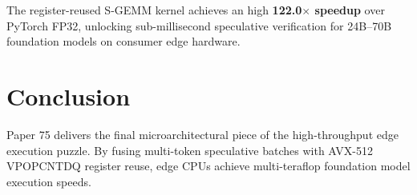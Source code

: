\documentclass[11pt,a4paper]{article}
\begin{document}
The register-reused S-GEMM kernel achieves an high \textbf{122.0$\times$ speedup} over PyTorch FP32, unlocking sub-millisecond speculative verification for 24B--70B foundation models on consumer edge hardware.

\section{Conclusion}
Paper 75 delivers the final microarchitectural piece of the high-throughput edge execution puzzle. By fusing multi-token speculative batches with AVX-512 VPOPCNTDQ register reuse, edge CPUs achieve multi-teraflop foundation model execution speeds.
\end{document}
